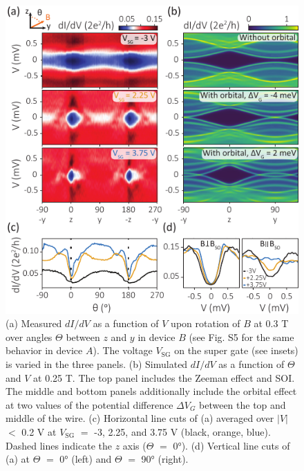 \begin{figure}
\includegraphics[width=\columnwidth]{chapter_spinorbit/figures/Fig3.pdf}
\caption{\label{fig3}
(a) Measured $dI/dV$ as a function of $V$ upon rotation of $B$ at 0.3 T over angles $\Theta$ between $z$ and $y$ in device $B$ (see Fig. S5 \cite{Note1} for the same behavior in device $A$).
The voltage $V_{\mathrm{SG}}$ on the super gate (see insets) is varied in the three panels.
(b) Simulated $dI/dV$ as a function of $\Theta$ and $V$ at 0.25 T.
The top panel includes the Zeeman effect and SOI.
The middle and bottom panels additionally include the orbital effect at two values of the potential difference $\Delta V_G$ between the top and middle of the wire.
(c) Horizontal line cuts of (a) averaged over $|V|$ $<$ 0.2 V at $V_{\mathrm{SG}}$ $=$ -3,  2.25, and 3.75 V (black, orange, blue).
Dashed lines indicate the $z$ axis ($\Theta$ $=$ \ang{0}).
(d) Vertical line cuts of (a) at $\Theta$ $=$ \ang{0} (left) and $\Theta$ $=$ \ang{90} (right).
}
\end{figure}

